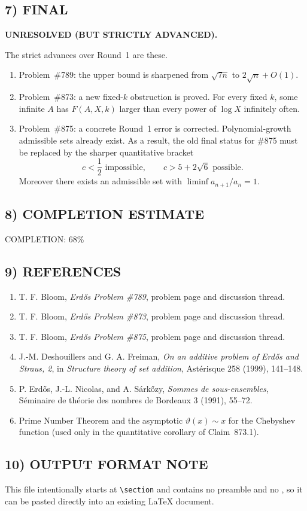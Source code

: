 \subsection*{7) FINAL}

\textbf{UNRESOLVED (BUT STRICTLY ADVANCED).}

The strict advances over Round~1 are these.

\begin{enumerate}
\item Problem~\#789: the upper bound is sharpened from \(\sqrt{7n}\) to \(2\sqrt n+O(1)\).
\item Problem~\#873: a new fixed-\(k\) obstruction is proved. For every fixed \(k\), some infinite \(A\) has \(F(A,X,k)\) larger than every power of \(\log X\) infinitely often.
\item Problem~\#875: a concrete Round~1 error is corrected. Polynomial-growth admissible sets already exist. As a result, the old final status for \#875 must be replaced by the sharper quantitative bracket
\[
  c<\frac12 \text{ impossible},
  \qquad
  c>5+2\sqrt6 \text{ possible}.
\]
Moreover there exists an admissible set with \(\liminf a_{n+1}/a_n=1\).
\end{enumerate}

\subsection*{8) COMPLETION ESTIMATE}

COMPLETION: 68\%

\subsection*{9) REFERENCES}

\begin{enumerate}
\item T. F. Bloom, \emph{Erd\H{o}s Problem \#789}, problem page and discussion thread.
\item T. F. Bloom, \emph{Erd\H{o}s Problem \#873}, problem page and discussion thread.
\item T. F. Bloom, \emph{Erd\H{o}s Problem \#875}, problem page and discussion thread.
\item J.-M. Deshouillers and G. A. Freiman, \emph{On an additive problem of Erd\H{o}s and Straus, 2}, in \emph{Structure theory of set addition}, Ast\'erisque 258 (1999), 141--148.
\item P. Erd\H{o}s, J.-L. Nicolas, and A. S\'ark\H{o}zy, \emph{Sommes de sous-ensembles}, S\'eminaire de th\'eorie des nombres de Bordeaux 3 (1991), 55--72.
\item Prime Number Theorem and the asymptotic \(\vartheta(x)\sim x\) for the Chebyshev function (used only in the quantitative corollary of Claim~873.1).
\end{enumerate}

\subsection*{10) OUTPUT FORMAT NOTE}

This file intentionally starts at \verb|\section| and contains no preamble and no \verb||, so it can be pasted directly into an existing LaTeX document.
